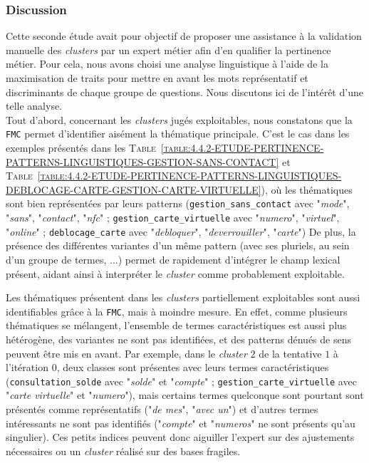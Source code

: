 		\subsubsection{Discussion}
		
			Cette seconde étude avait pour objectif de proposer une assistance à la validation manuelle des \textit{clusters} par un expert métier afin d'en qualifier la pertinence métier.
			Pour cela, nous avons choisi une analyse linguistique à l'aide de la maximisation de traits pour mettre en avant les mots représentatif et discriminants de chaque groupe de questions.
			Nous discutons ici de l'intérêt d'une telle analyse.
			\\
			
			Tout d'abord, concernant les \textit{clusters} jugés exploitables, nous constatons que la \texttt{FMC} permet d'identifier aisément la thématique principale.
			C'est le cas dans les exemples présentés dans les \textsc{Table~\ref{table:4.4.2-ETUDE-PERTINENCE-PATTERNS-LINGUISTIQUES-GESTION-SANS-CONTACT}} et \textsc{Table~\ref{table:4.4.2-ETUDE-PERTINENCE-PATTERNS-LINGUISTIQUES-DEBLOCAGE-CARTE-GESTION-CARTE-VIRTUELLE}}), où les thématiques sont bien représentées par leurs patterns (\texttt{gestion\_sans\_contact} avec "\textit{mode}", "\textit{sans}", "\textit{contact}", "\textit{nfc}" ; \texttt{gestion\_carte\_virtuelle} avec "\textit{numero}", "\textit{virtuel}", "\textit{online}" ; \texttt{deblocage\_carte} avec "\textit{debloquer}", "\textit{deverrouiller}", "\textit{carte}")
			De plus, la présence des différentes variantes d'un même pattern (avec ses pluriels, au sein d'un groupe de termes, ...) permet de rapidement d'intégrer le champ lexical présent, aidant ainsi à interpréter le \textit{cluster} comme probablement exploitable.
			
			Les thématiques présentent dans les \textit{clusters} partiellement exploitables sont aussi identifiables grâce à la \texttt{FMC}, mais à moindre mesure.
			En effet, comme plusieurs thématiques se mélangent, l'ensemble de termes caractéristiques est aussi plus hétérogène, des variantes ne sont pas identifiées, et des patterns dénués de sens peuvent être mis en avant.
			Par exemple, dans le \textit{cluster} $2$ de la tentative $1$ à l'itération $0$, deux classes sont présentes avec leurs termes caractéristiques (\texttt{consultation\_solde} avec "\textit{solde}" et "\textit{compte}" ; \texttt{gestion\_carte\_virtuelle} avec "\textit{carte virtuelle}" et "\textit{numero}"), mais certains termes quelconque sont pourtant sont présentés comme représentatifs ("\textit{de mes}", "\textit{avec un}") et d'autres termes intéressants ne sont pas identifiés ("\textit{compte}" et "\textit{numeros}" ne sont présents qu'au singulier).
			Ces petits indices peuvent donc aiguiller l'expert sur des ajustements nécessaires ou un \textit{cluster} réalisé sur des bases fragiles.
			
